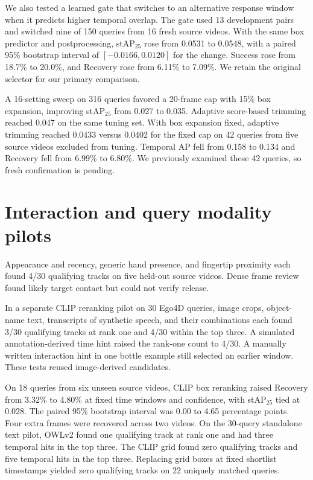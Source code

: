 \documentclass{article}
\begin{document}
We also tested a learned gate that switches to an alternative response window when it predicts higher temporal overlap. The gate used 13 development pairs and switched nine of 150 queries from 16 fresh source videos. With the same box predictor and postprocessing, stAP$_{25}$ rose from 0.0531 to 0.0548, with a paired 95\% bootstrap interval of $[-0.0166, 0.0120]$ for the change. Success rose from 18.7\% to 20.0\%, and Recovery rose from 6.11\% to 7.09\%. We retain the original selector for our primary comparison.

A 16-setting sweep on 316 queries favored a 20-frame cap with 15\% box expansion, improving stAP$_{25}$ from 0.027 to 0.035. Adaptive score-based trimming reached 0.047 on the same tuning set. With box expansion fixed, adaptive trimming reached 0.0433 versus 0.0402 for the fixed cap on 42 queries from five source videos excluded from tuning. Temporal AP fell from 0.158 to 0.134 and Recovery fell from 6.99\% to 6.80\%. We previously examined these 42 queries, so fresh confirmation is pending.

\section{Interaction and query modality pilots}
Appearance and recency, generic hand presence, and fingertip proximity each found 4/30 qualifying tracks on five held-out source videos. Dense frame review found likely target contact but could not verify release.

In a separate CLIP reranking pilot on 30 Ego4D queries, image crops, object-name text, transcripts of synthetic speech, and their combinations each found 3/30 qualifying tracks at rank one and 4/30 within the top three. A simulated annotation-derived time hint raised the rank-one count to 4/30. A manually written interaction hint in one bottle example still selected an earlier window. These tests reused image-derived candidates.

On 18 queries from six unseen source videos, CLIP box reranking raised Recovery from 3.32\% to 4.80\% at fixed time windows and confidence, with stAP$_{25}$ tied at 0.028. The paired 95\% bootstrap interval was 0.00 to 4.65 percentage points. Four extra frames were recovered across two videos. On the 30-query standalone text pilot, OWLv2 found one qualifying track at rank one and had three temporal hits in the top three. The CLIP grid found zero qualifying tracks and five temporal hits in the top three. Replacing grid boxes at fixed shortlist timestamps yielded zero qualifying tracks on 22 uniquely matched queries.
\end{document}
